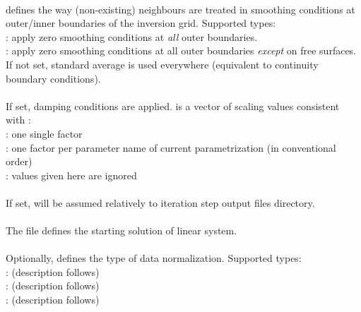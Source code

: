 \paragraph{}
 defines the way (non-existing) neighbours are treated in smoothing conditions at outer/inner 
boundaries of the inversion grid. Supported types:\\
: apply zero smoothing conditions at \emph{all} outer boundaries.\\
: apply zero smoothing conditions at all outer boundaries \emph{except} on free surfaces. \\
If not set, standard average is used everywhere (equivalent to continuity boundary conditions).
\paragraph{}
If set, damping conditions are applied.  is a vector of scaling values consistent 
with :\\
: one single factor\\
: one factor per parameter name of current parametrization (in conventional order)\\
 : values given here are ignored
\paragraph{}
If set,  will be assumed relatively to iteration step output files directory.
\paragraph{}
The  file  defines the starting solution of linear system.
\paragraph{}
Optionally,  defines the type of data normalization. Supported types:\\
: (description follows)\\ %
: (description follows)\\ %
: (description follows) %
%
%

